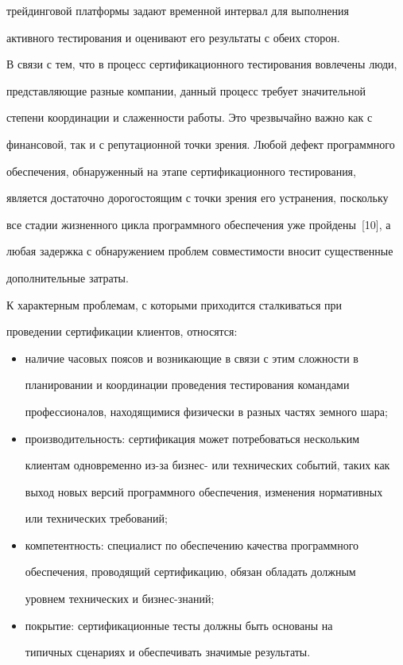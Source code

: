 трейдинговой платформы задают временной интервал для выполнения


активного тестирования и оценивают его результаты с обеих сторон.





В связи с тем, что в процесс сертификационного тестирования вовлечены люди,


представляющие разные компании, данный процесс требует значительной


степени координации и слаженности работы. Это чрезвычайно важно как с


финансовой, так и с репутационной точки зрения. Любой дефект про\-грам\-мно\-го


обеспечения, обнаруженный на этапе сертификационного тестирования,


является достаточно дорогостоящим с точки зрения его устранения, поскольку


все стадии жизненного цикла программного обеспечения уже пройдены~[10], а


любая задержка с обнаружением проблем совместимости вносит существенные


дополнительные затраты.





К характерным проблемам, с которыми приходится сталкиваться при


проведении сертификации клиентов, относятся:


\begin{itemize}


\item наличие часовых поясов и возникающие в связи с этим сложности в


планировании и координации проведения тестирования командами


профессионалов, находящимися физически в разных частях земного шара;


\item производительность: сертификация может потребоваться нескольким


клиентам одновременно из-за бизнес- или технических событий, таких как


выход новых версий программного обеспечения, изменения нормативных


или технических требований;


\item компетентность: специалист по обеспечению качества программного


обеспечения, проводящий сертификацию, обязан обладать должным


уровнем технических и биз\-нес-зна\-ний;


\item покрытие: сертификационные тесты должны быть основаны на


типичных сценариях и обеспечивать значимые результаты.


\end{itemize}





